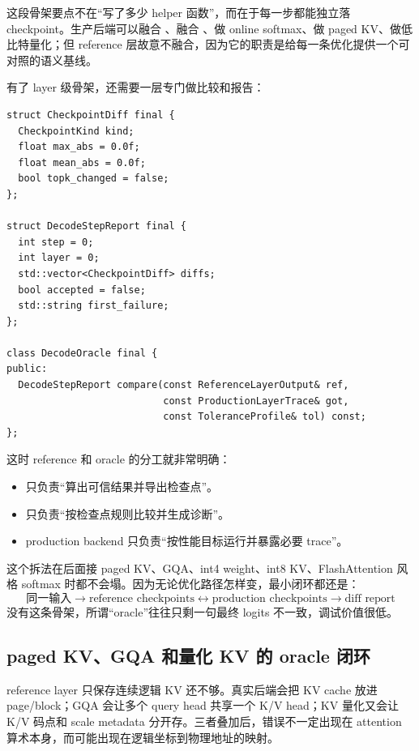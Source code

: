 这段骨架要点不在“写了多少 helper 函数”，而在于每一步都能独立落 checkpoint。生产后端可以融合 、融合 、做 online softmax、做 paged KV、做低比特量化；但 reference 层故意不融合，因为它的职责是给每一条优化提供一个可对照的语义基线。

有了 layer 级骨架，还需要一层专门做比较和报告：

\begin{lstlisting}[numbers=none,caption={decode oracle 的比较与报告骨架}]
struct CheckpointDiff final {
  CheckpointKind kind;
  float max_abs = 0.0f;
  float mean_abs = 0.0f;
  bool topk_changed = false;
};

struct DecodeStepReport final {
  int step = 0;
  int layer = 0;
  std::vector<CheckpointDiff> diffs;
  bool accepted = false;
  std::string first_failure;
};

class DecodeOracle final {
public:
  DecodeStepReport compare(const ReferenceLayerOutput& ref,
                           const ProductionLayerTrace& got,
                           const ToleranceProfile& tol) const;
};
\end{lstlisting}

这时 reference 和 oracle 的分工就非常明确：

\begin{itemize}
  \item {} 只负责“算出可信结果并导出检查点”。
  \item {} 只负责“按检查点规则比较并生成诊断”。
  \item production backend 只负责“按性能目标运行并暴露必要 trace”。
\end{itemize}

这个拆法在后面接 paged KV、GQA、int4 weight、int8 KV、FlashAttention 风格 softmax 时都不会塌。因为无论优化路径怎样变，最小闭环都还是：
\[
\text{同一输入} \rightarrow \text{reference checkpoints} \leftrightarrow \text{production checkpoints} \rightarrow \text{diff report}
\]
没有这条骨架，所谓“oracle”往往只剩一句最终 logits 不一致，调试价值很低。

\subsection{paged KV、GQA 和量化 KV 的 oracle 闭环}

reference layer 只保存连续逻辑 KV 还不够。真实后端会把 KV cache 放进 page/block；GQA 会让多个 query head 共享一个 K/V head；KV 量化又会让 K/V 码点和 scale metadata 分开存。三者叠加后，错误不一定出现在 attention 算术本身，而可能出现在逻辑坐标到物理地址的映射。

